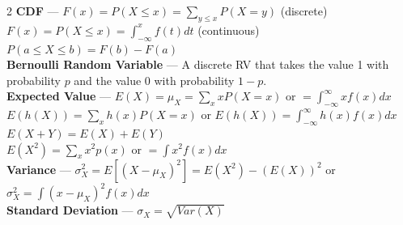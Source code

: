 \documentclass[10pt,letterpaper]{article}
\begin{document}
\begin{multicols}{2}
\textbf{CDF} --- $F(x) = P(X \leq x) = \sum_{y \leq x} P(X = y)$ (discrete)\\
$F(x) = P(X \leq x) = \int_{-\infty}^{x} f(t)dt$ (continuous)\\
$P(a \leq X \leq b) = F(b) - F(a)$\\
\textbf{Bernoulli Random Variable} --- A discrete RV that takes the value 1 with probability \( p \) and the value 0 with probability \( 1-p \).\\
\textbf{Expected Value} --- $E(X) = \mu_X = \sum_x xP(X=x)$ or $= \int_{-\infty}^{\infty} xf(x)dx$\\
$E(h(X)) = \sum_x h(x)P(X=x)$ or $E(h(X)) = \int_{-\infty}^{\infty} h(x)f(x)dx$\\
$E(X + Y) = E(X) + E(Y)$\\
$E(X^2) = \sum_x x^2p(x)$ or $= \int x^2f(x)dx$\\
\textbf{Variance} --- $\sigma_X^2 = E[(X - \mu_X)^2] = E(X^2) - (E(X))^2$ or $\sigma_X^2 = \int (x - \mu_X)^2 f(x) dx$\\
\textbf{Standard Deviation} --- $\sigma_X = \sqrt{Var(X)}$\\
\\

\end{multicols}
\end{document}
